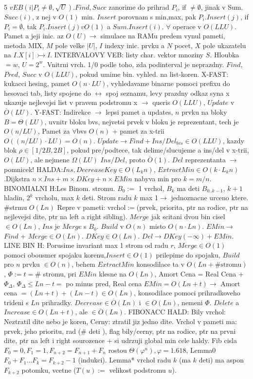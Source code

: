 \documentclass[8pt]{extarticle}
\begin{document}
\begin{multicols*}{5}
$vEB({i|P_i\neq\emptyset}, \sqrt{U})$.$Find, Succ$ zanorime do prihrad $P_i$, if $\neq\emptyset$, jinak v Sum.$Succ(i)$, z nej v $O(1)$ min. $Insert$ porovnam s min,max, pak $P_i.Insert(j)$, if$P_i = \emptyset$, tak $P_i.Insert(j) v O(1)$ a $Sum.Insert(i)$. $\forall$ operace v $O(LLU)$. Pamet a jeji inic. az $O(U) \rightarrow$ simulace na RAMu predem vynul pameti, metoda MIX, $M$ pole velke $|U|$, $I$ indexy inic. prvku a $N$ pocet, $X$ pole ukazatelu na $I$.$X[i]\rightarrowtail I$. INTERVALOVY VEB: listy char. vektor mnoziny $S$. Hloubka$=w$, $U=2^w$. Vnitrni vrch. 1/0 podle toho, zda podinterval je neprazdny. $Find$, $Pred$, $Succ$ v $O(LLU)$, pokud umime bin. vyhled. na list-koren. X-FAST:  kukacci hesing, pamet $O(n\cdot LU)$, vyhledavame binarne pomoci prefixu do hesovaci tab, listy spojene do $\leftrightarrow$ spoj seznamu, levy prazdny odkaz syna x ukazuje nejlevejsi list v pravem podstromu x $\rightarrow$ queris $O(LLU)$, $Update$ v $\overline{O}(LU)$. Y-FAST: Indirekce $\rightarrow$ lepsi pamet a updates, $n$ prvku na bloky $B=\Theta(LU)$, uvnitr bloku bvs, nejvetsi prvek v bloku je reprezentant, tech je $O(n/LU)$, Pamet za $\forall$bvs $O(n)$ + pamet za x-trii $O((n/LU)\cdot LU)=O(n)$. $Update \rightarrow Find + Ins/Del_{bvs} \in O(LLU)$, kazdy blok $\rho\in[1/2B, 2B]$, pokud pre/podtece, tak delime/slucujeme a ins/del v x-trii, $O(LU)$, ale nejmene $\Omega(LU)$ $Ins/Del$, proto $\overline{O}(1)$. $Del$ reprezentanta $\rightarrow$ pomnicek! HALDA:$Ins,DecreaseKey\in O(L_{k}n)$, $ExtractMin\in O(k\cdot L_{k}n)$.Dijkstra $n\times Ins + m\times DKey +n \times EMin$ nabyva min pro $k=m/n$. BINOMIALNI H:Les Binom. stromu. $B_0 :=$ 1 vrchol, $B_k$ ma deti $B_{0..k-1}$, $k+1$ hladin, $2^k$ vrcholu, max $k$ deti. Strom radu $k$ max 1$\rightarrow$ jednoznacne urceno ktere. $\#$strmu $O(Ln)$ Repre v pameti: vrchol$:=$(prvek, priorita, ptr na rodice, ptr na nejlevejsi dite, ptr na left a right sibling). $Merge$ jak scitani dvou bin cisel$\in O(Ln)$, $Ins$ je $Merge$ s $B_0$. $Build$ v $O(n)$ misto $O(n\cdot Ln)$. $EMin\rightarrow$ $Find$ + $Merge \in O(Ln)$. $DKey \in O(Ln)$. $Del\rightarrow DKey(-\infty) + EMin$. LINE BIN H: Porusime invariant max 1 strom od radu $r$, $Merge \in O(1)$ pomoci obousmer spojaku korenu,$Insert \in O(1)$ prilepime do spojaku, $Build$ pro $n$ prvku $\in O(n)$, behem $ExtractMin$ konsodilace ta v $O(Ln + \#\text{stromu})$, $\Phi := t =\#$ stromu, pri $EMin$ klesne na $O(Ln)$, Amort Cena = Real Cena + $\Phi_\Delta$, $\Phi_\Delta \leq Ln - t =$ po minus pred, Real cena $EMin = O(Ln + t)\rightarrow$ Amort cena $=(Ln + t) + (Ln - t) \in O(Ln)$, konsodilace pomoci prihradkoveho trideni s $Ln$ prihradky. $Decrease \in \overline{O}(Ln)$ i $\in O(Ln)$, nemeni $\Phi$. $Delete$ a $Increase \in O(Ln + t)$, ale $\in \overline{O}(Ln)$. FIBONACC HALD: Bily vrchol: Neztratil dite nebo je koren, Cerny: ztratil jiz jedno dite. Vrchol v pameti ma: prvek, jeho prioritu, rad (\# deti ), flag bily/cerny, ptr na rodice, ptr na prvni dite, ptr na left i right sourozence + si udrzuji global min cele haldy. Fib cisla $F_0=0, F_1=1, F_{n+2}=F_{n+1}+F_n$ rostou $\Theta(\varphi^n), \varphi=1.618$, Lemma0 $F_0+F_1\ldots F_k=F_{k+2}-1$ (indukci). Lemma* vrchol radu $k$ (ma $k$ deti) ma aspon $F_{k+2}$ potomku, vcetne ($T(u):=$ velikost podstromu $u$). 
\end{multicols*}
\end{document}
